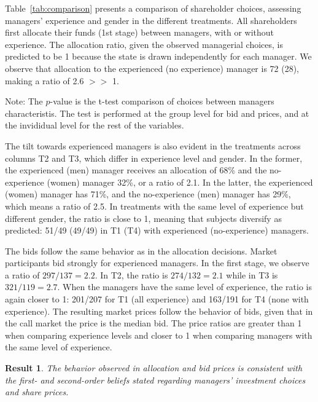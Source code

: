\documentclass[12pt, letterpaper]{article}
\newtheorem{result}{Result}
\begin{document}
Table~\ref{tab:comparison} presents a comparison of shareholder choices, assessing managers' experience and gender in the different treatments. All shareholders first allocate their funds (1st stage) between managers, with or without experience. The allocation ratio, given the observed managerial choices, is predicted to be 1 because the state is drawn independently for each manager. We observe that allocation to the experienced (no experience) manager is 72 (28), making a ratio of 2.6 $>>$ 1.  

\begin{table}[hbtp]
  \caption{Choices by treatment}
  \label{tab:comparison}
  \footnotesize
  \begin{center}
    
  \end{center}
  {\scriptsize 
    Note: The $p$-value is the t-test comparison of choices between managers characteristis. 
    The test is performed at the group level for bid and prices, and at the invididual level 
    for the rest of the variables. 
  }
\end{table}

The tilt towards experienced managers is also evident in the treatments across columns T2 and T3, which differ in experience level and gender. In the former, the experienced (men) manager receives an allocation of 68\% and the no-experience (women) manager 32\%, or a ratio of 2.1. In the latter, the experienced (women) manager has 71\%, and the no-experience (men) manager has 29\%, which means a ratio of 2.5. In treatments with the same level of experience but different gender, the ratio is close to 1, meaning that subjects diversify as predicted: 51/49 (49/49) in T1 (T4) with experienced (no-experience) managers.

The bids follow the same behavior as in the allocation decisions. Market participants bid strongly for experienced managers. In the first stage, we observe a ratio of $297/137 = 2.2$. In T2, the ratio is $274/132 = 2.1$ while in T3 is $321/119 = 2.7$. When the managers have the same level of experience, the ratio is again closer to 1: 201/207 for T1 (all experience) and 163/191 for T4 (none with experience). The resulting market prices follow the behavior of bids, given that in the call market the price is the median bid. The price ratios are greater than 1 when comparing experience levels and closer to 1 when comparing managers with the same level of experience. 

\begin{result}\label{r3} The behavior observed in allocation and bid prices is consistent with the first- and second-order beliefs stated regarding managers' investment choices and share prices.
\end{result}
\end{document}
